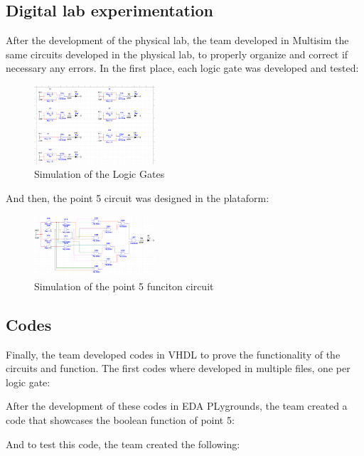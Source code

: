 \documentclass[12pt]{article}  %
\begin{document}
\subsection{Digital lab experimentation}
After the development of the physical lab, the team developed in Multisim the same circuits developed in the physical lab, to properly organize and correct if necessary any errors.
In the first place, each logic gate was developed and tested:
\begin{figure}[H]
  \centering
  \includegraphics[width=0.4\textwidth]{LogiGates.png}
  \caption{Simulation of the Logic Gates}
  \label{fig:sim_logic_gates}
\end{figure}
And then, the point 5 circuit was designed in the plataform:
\begin{figure}[H]
  \centering
  \includegraphics[width=0.4\textwidth]{Point5Multisim.png}
  \caption{Simulation of the point 5 funciton circuit}
  \label{fig:sim_point_5}
\end{figure}

\subsection{Codes}
Finally, the team developed codes in VHDL to prove the functionality of the circuits and function.
The first codes where developed in multiple files, one per logic gate:







After the development of these codes in EDA PLygrounds, the team created a code that showcases the boolean function of point 5:

And to test this code, the team created the following:

\end{document}

